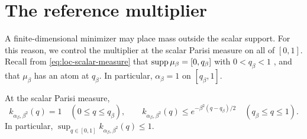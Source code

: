 \section{The reference multiplier}\label{sec:sc-reference}

A finite-dimensional minimizer may place mass outside the scalar
support. For this reason, we control the multiplier at the scalar
Parisi measure on all of $[0,1]$. Recall from
\eqref{eq:loc-scalar-measure} that $\operatorname{supp}\mu_\beta=[0,q_\beta]$ with
$0<q_\beta<1$ \cite[Theorem~1.1]{Lopatto}, and that $\mu_\beta$ has an
atom at $q_\beta$. In particular, $\alpha_\beta=1$ on $[q_\beta,1]$.

\begin{lemma}\label{lem:reference}
At the scalar Parisi measure,
\begin{equation}\label{eq:referencek}
 k_{\alpha_\beta,\beta^2}(q)=1\quad(0\le q\le q_\beta),
 \qquad
 k_{\alpha_\beta,\beta^2}(q)
       \le e^{-\beta^2(q-q_\beta)/2}\quad(q_\beta\le q\le1).
\end{equation}
In particular, $\sup_{q\in[0,1]}k_{\alpha_\beta,\beta^2}(q)\le1$.
\end{lemma}

